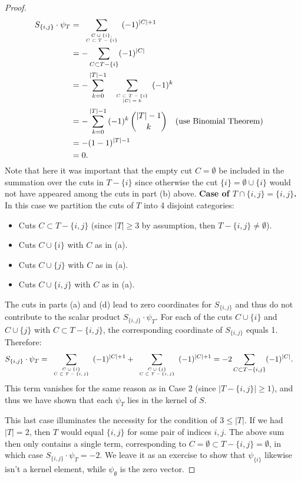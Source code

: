 \documentclass[12pt]{amsart}
\numberwithin{theorem}{section}
\theoremstyle{remark}
\begin{document}
\begin{proof}
\begin{align*}
S_{\{i,j\}} \cdot \psi_T & = \sum _{\tiny\begin{array}{c} C\cup\{i\}, \cr  
 C\subset T-\{i\}\end{array}} (-1)^{|C|+1} \cr
& = - \sum _{C\subset T-\{i\}} (-1)^{|C|} \cr 
& = - \sum_{k=0}^{|T|-1}\, \, \,  \sum _{\tiny \begin{array}{c} C\subset T-\{i\}\cr |C|=k \end{array}} (-1)^{k} \cr 
& = - \sum_{k=0}^{|T|-1}\,(-1)^k\, {|T|-1\choose k} \quad \text{(use Binomial Theorem)}  \cr 
& = -(1-1)^{|T|-1} \cr
& = 0. 
\end{align*}
Note that here it was important that the empty cut $C=\emptyset$ be included in the summation over the cuts in $T-\{i\}$ since otherwise the cut $\{i\} = \emptyset \cup \{i\}$ would not have appeared among the cuts in part (b) above.  
\vskip3mm
{\bf Case of $T\cap \{i,j\} = \{i,j\}$.} In this case we partition the cuts of $T$ into 4 disjoint categories:
\begin{itemize}
\item[(a)] Cuts $C\subset T-\{i,j\}$  (since $|T|\ge 3$ by assumption, then $T-\{i,j\}\ne \emptyset$).  
\item[(b)] Cuts $C\cup \{i\}$ with $C$ as in (a). 
\item[(c)] Cuts $C\cup \{j\}$ with $C$ as in (a). 
\item[(d)] Cuts $C\cup \{i,j \}$ with $C$ as in (a).  
\end{itemize} 
The cuts in parts (a) and (d) lead to zero coordinates for $S_{\{i,j\}}$ and thus do not contribute to the scalar product $S_{\{i,j\}} \cdot \psi_T$. For each of the cuts $C\cup\{i\}$ and $C\cup\{j\}$ with $C\subset T-\{i,j\}$, the corresponding coordinate of $S_{\{i,j\}}$ equals 1. Therefore:
\begin{align*}
S_{\{i,j\}} \cdot \psi_T & = \sum  _{\tiny \begin{array}{c} C\cup\{i\} \cr C\subset T-\{i,j\}  \end{array}} (-1)^{|C|+1} + \sum  _{\tiny \begin{array}{c} C\cup\{j\} \cr C\subset T-\{i,j\}  \end{array}} (-1)^{|C|+1} = -2\sum _{C\subset T-\{i,j\}} (-1)^{|C|}.
\end{align*} 
This term vanishes for the same reason as in Case 2 (since $|T-\{i,j\}|\ge 1$), and thus we have shown that each $\psi_T$ lies in the kernel of $S$. 

This last case illuminates the necessity for the condition of $3\le |T|$. If we had $|T|=2$, then $T$ would equal $\{i,j\}$ for some pair of indices $i, j$. The above sum then only contains a single term, corresponding to $C= \emptyset \subset T-\{i,j\} = \emptyset$,  in which case $S_{\{i,j\}} \cdot \psi_T = -2$. We leave it as an exercise to show that $\psi_{\{i\}}$ likewise isn't a kernel element, while $\psi_\emptyset$ is the zero vector. 
\end{proof}
\end{document}
